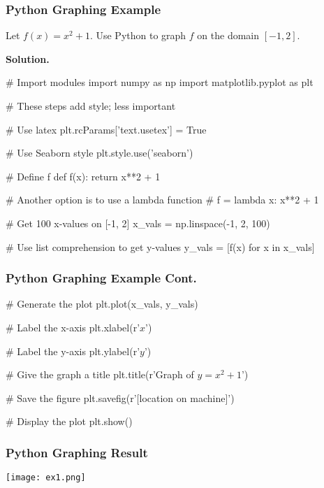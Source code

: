\documentclass{beamer}
\begin{document}
\begin{frame}[fragile]
\frametitle{Python Graphing Example}

\begin{example} 
Let $f(x) = x^2 + 1$. Use Python to graph $f$ on the domain $[-1, 2]$.
\end{example}

{
\linespread{0.8}
{\bf Solution.}  
{\tiny
\begin{verbatim*}
# Import modules 
import numpy as np
import matplotlib.pyplot as plt

# These steps add style; less important

# Use latex
plt.rcParams['text.usetex'] = True

# Use Seaborn style
plt.style.use('seaborn')

# Define f
def f(x):
    return x**2 + 1

# Another option is to use a lambda function
# f = lambda x: x**2 + 1

# Get 100 x-values on [-1, 2]
x_vals = np.linspace(-1, 2, 100)

# Use list comprehension to get y-values
y_vals = [f(x) for x in x_vals]

\end{verbatim*}
}}
\end{frame}

\begin{frame}[fragile]
\frametitle{Python Graphing Example Cont.}
{
\linespread{0.8}
\small

\begin{verbatim*}

# Generate the plot
plt.plot(x_vals, y_vals)

# Label the x-axis
plt.xlabel(r'$x$')

# Label the y-axis
plt.ylabel(r'$y$')

# Give the graph a title
plt.title(r'Graph of $y = x^2 + 1$')

# Save the figure
plt.savefig(r'[location on machine]')

# Display the plot
plt.show()
\end{verbatim*}
}

\end{frame}

\begin{frame}
\frametitle{Python Graphing Result}
\begin{center}
\texttt{[image: ex1.png]}
\end{center}
\end{frame}
\end{document}
